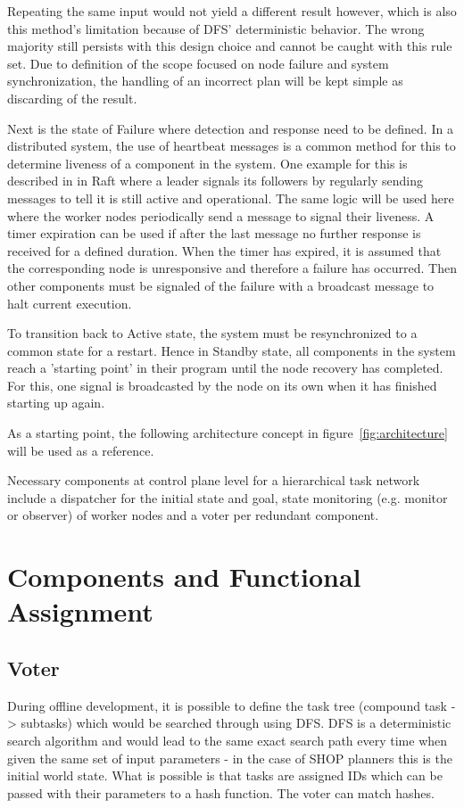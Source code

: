 

Repeating the same input would not yield a different result however, which is also this method's limitation because of DFS' deterministic behavior. The wrong majority still persists with this design choice and cannot be caught with this rule set. Due to definition of the scope focused on node failure and system synchronization, the handling of an incorrect plan will be kept simple as discarding of the result.

Next is the state of Failure where detection and response need to be defined. In a distributed system, the use of heartbeat messages is a common method for this to determine liveness of a component in the system. One example for this is described in \textcite{steen_distributed_2025} in Raft where a leader signals its followers by regularly sending messages to tell it is still active and operational. The same logic will be used here where the worker nodes periodically send a message to signal their liveness. A timer expiration can be used if after the last message no further response is received for a defined duration. When the timer has expired, it is assumed that the corresponding node is unresponsive and therefore a failure has occurred. Then other components must be signaled of the failure with a broadcast message to halt current execution.

To transition back to Active state, the system must be resynchronized to a common state for a restart. Hence in Standby state, all components in the system reach a 'starting point' in their program until the node recovery has completed. For this, one signal is broadcasted by the node on its own when it has finished starting up again.

As a starting point, the following architecture concept in figure~\ref{fig:architecture} will be used as a reference.



Necessary components at control plane level for a hierarchical task network include a dispatcher for the initial state and goal, state monitoring (e.g. monitor or observer) of worker nodes and a voter per redundant component.

\section{Components and Functional Assignment}

\subsection{Voter}
During offline development, it is possible to define the task tree (compound task -> subtasks) which would be searched through using DFS. DFS is a deterministic search algorithm and would lead to the same exact search path every time when given the same set of input parameters - in the case of SHOP planners this is the initial world state. What is possible is that tasks are assigned IDs which can be passed with their parameters to a hash function. The voter can match hashes.

